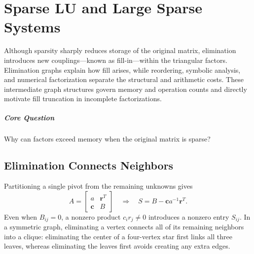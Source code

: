 \chapter{Sparse LU and Large Sparse Systems}\label{v0ch:5}
\begin{chaptersummary}
Although sparsity sharply reduces storage of the original matrix, elimination introduces new couplings—known as fill-in—within the triangular factors. Elimination graphs explain how fill arises, while reordering, symbolic analysis, and numerical factorization separate the structural and arithmetic costs. These intermediate graph structures govern memory and operation counts and directly motivate fill truncation in incomplete factorizations.
\end{chaptersummary}
\paragraph{Core Question}Why can factors exceed memory when the original matrix is sparse?

\section{Elimination Connects Neighbors}
Partitioning a single pivot from the remaining unknowns gives
\[
 A=\begin{bmatrix}a&\bm r^T\\\bm c&B\end{bmatrix}
 \quad\Rightarrow\quad
 S=B-\bm c a^{-1}\bm r^T.
\]
Even when $B_{ij}=0$, a nonzero product $c_i r_j\ne0$ introduces a nonzero entry $S_{ij}$. In a symmetric graph, eliminating a vertex connects all of its remaining neighbors into a clique: eliminating the center of a four-vertex star first links all three leaves, whereas eliminating the leaves first avoids creating any extra edges.
